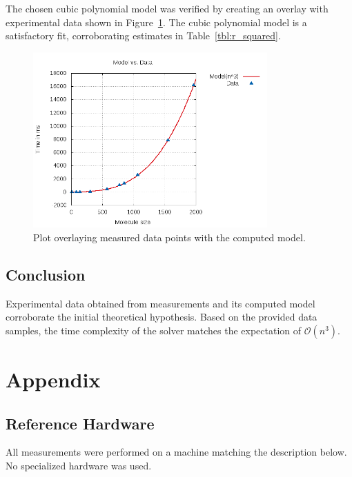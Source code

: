 \documentclass[a4paper,12pt]{article}
\begin{document}
The chosen cubic polynomial model was verified by creating an overlay with experimental
data shown in Figure~\ref{fig:overlay}. The cubic polynomial model is a satisfactory
fit, corroborating estimates in Table~\ref{tbl:r_squared}.

\begin{figure}[!h]
  \centering
    \includegraphics[width=0.8\textwidth]{images/solver-perf-model.png}
  \caption{Plot overlaying measured data points with the computed model.}
  \label{fig:overlay}
\end{figure}

\subsection{Conclusion}
Experimental data obtained from measurements and its computed model
corroborate the initial theoretical hypothesis. Based on the provided data samples,
the time complexity of the solver matches the expectation of $\mathcal{O}(n^3)$.

\pagebreak

\section{Appendix}

\subsection{Reference Hardware}
\label{subsec:ref_hw}

All measurements were performed on a machine matching the description below.
No specialized hardware was used.
\end{document}
